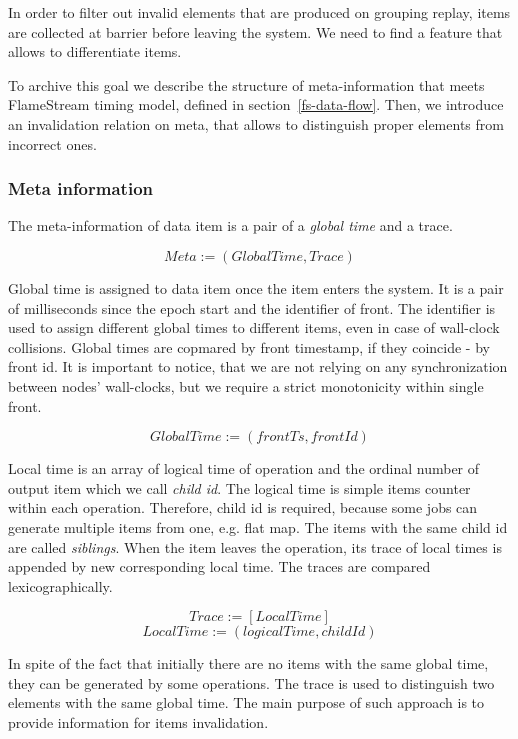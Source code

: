 \label {fs-adaptive}

In order to filter out invalid elements that are produced on grouping replay, items are collected at barrier before leaving the system. We need to find a feature that allows to differentiate items.

To archive this goal we describe the structure of meta-information that meets FlameStream timing model, defined in section~\ref{fs-data-flow}. Then, we introduce an invalidation relation on meta, that allows to distinguish proper elements from incorrect ones.

\subsubsection{Meta information}
The meta-information of data item is a pair of a {\it global time} and a trace.

\[Meta := (GlobalTime, Trace)\]

Global time is assigned to data item once the item enters the system. It is a pair of milliseconds since the epoch start and the identifier of front. The identifier is used to assign different global times to different items, even in case of wall-clock collisions. Global times are copmared by front timestamp, if they coincide - by front id. It is important to notice, that we are not relying on any synchronization between nodes' wall-clocks, but we require a strict monotonicity within single front.

\[GlobalTime := (frontTs, frontId)\]

Local time is an array of logical time of operation and the ordinal number of output item which we call {\it child id}. The logical time is simple items counter within each operation. Therefore, child id is required, because some jobs can generate multiple items from one, e.g. flat map. The items with the same child id are called {\it siblings}. When the item leaves the operation, its trace of local times is appended by new corresponding local time. The traces are compared lexicographically.

\[Trace := [LocalTime]\]
\[LocalTime := (logicalTime, childId)\]

In spite of the fact that initially there are no items with the same global time, they can be generated by some operations. The trace is used to distinguish two elements with the same global time. The main purpose of such approach is to provide information for items invalidation. 

